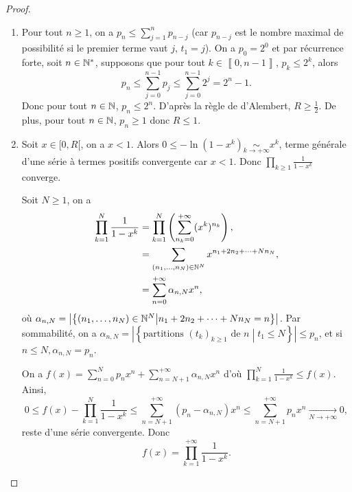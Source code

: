 \documentclass[12pt]{article}
\begin{document}
\begin{proof}
    \phantom{}
    \begin{enumerate}
        \item Pour tout $n\geqslant1$, on a $p_n\leqslant\sum_{j=1}^{n}p_{n-j}$ (car $p_{n-j}$ est le nombre maximal de possibilité si le premier terme vaut $j$, $t_{1}=j$). On a $p_0=2^{0}$ et par récurrence forte, soit $n\in\mathbb{N}^{*}$, supposons que pour tout $k\in\left\llbracket0,n-1\right\rrbracket$, $p_{k}\leqslant2^{k}$, alors 
        \begin{equation}
            p_n\leqslant\sum_{j=0}^{n-1}p_j\leqslant\sum_{j=0}^{n-1}2^{j}=2^{n}-1.
        \end{equation}
        Donc pour tout $n\in\mathbb{N}$, $p_n\leqslant 2^{n}$. D'après la règle de d'Alembert, $R\geqslant\frac{1}{2}$. De plus, pour tout $n\in\mathbb{N}$, $p_n\geqslant1$ donc $R\leqslant 1$.

        \item Soit $x\in[0,R[$, on a $x<1$. Alors $0\leqslant-\ln\left(1-x^{k}\right)\underset{k\to+\infty}{\sim}x^{k}$, terme générale d'une série à termes positifs convergente car $x<1$. Donc $\prod_{k\geqslant1}\frac{1}{1-x^{k}}$ converge.
        
        Soit $N\geqslant1$, on a 
        \begin{align}
            \prod_{k=1}^{N}\frac{1}{1-x^{k}}
            &=\prod_{k=1}^{N}\left(\sum_{n_k=0}^{+\infty}(x^{k})^{n_k}\right),\\
            &=\sum_{(n_{1},\dots,n_{N})\in\mathbb{N}^{N}}x^{n_{1}+2n_{2}+\dots+Nn_{N}},\\
            &=\sum_{n=0}^{+\infty}\alpha_{n,N}x^{n},
        \end{align}
        où $\alpha_{n,N}=\left\lvert\left\lbrace(n_1,\dots,n_N)\in\mathbb{N}^{N}\middle| n_1+2n_2+\dots+Nn_{N}=n\right\rbrace\right\rvert$. Par sommabilité, on a $\alpha_{n,N}=\left\lvert\left\lbrace\text{partitions }(t_k)_{k\geqslant1}\text{ de }n\middle| t_1\leqslant N\right\rbrace\right\rvert\leqslant p_n$, et si $n\leqslant N, \alpha_{n,N}=p_n$. 
        
        On a $f(x)=\sum_{n=0}^{N}p_nx^{n}+\sum_{n=N+1}^{+\infty}\alpha_{n,N}x^{n}$ d'où $\prod_{k=1}^{N}\frac{1}{1-x^{k}}\leqslant f(x)$. Ainsi,
        \begin{equation}
            0\leqslant f(x)-\prod_{k=1}^{N}\frac{1}{1-x^{k}}\leqslant\sum_{n=N+1}^{+\infty}\left(p_n-\alpha_{n,N}\right)x^{n}\leqslant\sum_{n=N+1}^{+\infty}p_n x^{n}\xrightarrow[N\to+\infty]{}0,
        \end{equation}
        reste d'une série convergente. Donc 
        \begin{equation}
            f(x)=\prod_{k=1}^{+\infty}\frac{1}{1-x^{k}}.
        \end{equation}


\end{enumerate}
\end{proof}
\end{document}
